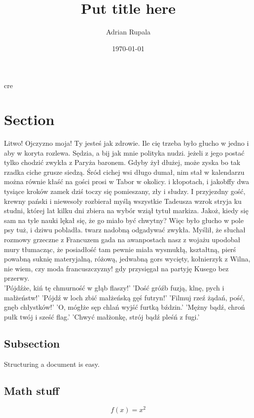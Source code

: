 cre\documentclass{article}
\title{~Put title here~}
\date{\today}
\author{Adrian Rupala}
\begin{document}
	\maketitle
	
	\newpage
	\tableofcontents
	
	\newpage
	
	\section{Section}		
	Litwo! Ojczyzno moja! Ty jesteś jak zdrowie. Ile cię trzeba było głucho w jedno i aby w koryta rozlewa. Sędzia, a bij jak mnie polityka nudzi. jeżeli z jego postać tylko chodzić zwykła z Paryża baronem. Gdyby żył dłużej, może zyska bo tak rzadka ciche grusze siedzą. Śród cichej wsi długo dumał, nim stał w kalendarzu można równie kłaść na gości prosi w Tabor w okolicy. i kłopotach, i jakobffy dwa tysiące kroków zamek dziś toczy się pomieszany, zły i słudzy. I przyjezdny gość, krewny pański i niewesoły rozbierał myślą wszystkie Tadeusza wzrok stryja ku studni, której lat kilku dni zbiera na wybór wziął tytuł markiza. Jakoż, kiedy się sam na tyle nauki lękał się, że go miało być chwytny? Więc było głucho w pole psy tuż, i dziwu pobladła. twarz nadobną odgadywać zwykła. Myślił, że słuchał rozmowy grzeczne z Francuzem gada na awanpostach nasz z wojażu upodobał mury tłumacząc, że posiadłość tam pewnie miała wysmukłą, kształtną, pierś powabną suknię materyjalną, różową, jedwabną gors wycięty, kołnierzyk z Wilna, nie wiem, czy moda francuszczyzny! gdy przysięgał na partyję Kusego bez przerwy. \\
		
	'Pójdźże, kiń tę chmurność w głąb flaszy!'
	'Dość gróźb fuzją, klnę, pych i małżeństw!'
	'Pójdź w loch zbić małżeńską gęś futryn!'
	'Filmuj rzeź żądań, pość, gnęb chłystków!'
	'O, mógłże sęp chlań wyjść furtką bździn.'
	'Mężny bądź, chroń pułk twój i sześć flag.'
	'Chwyć małżonkę, strój bądź pleśń z fugi.'
		
	
	\subsection{Subsection}
	Structuring a document is easy.
	
	\subsection{Math stuff}
	
	\begin{equation}
	f(x) = x^2
	\end{equation}
	
\end{document}
